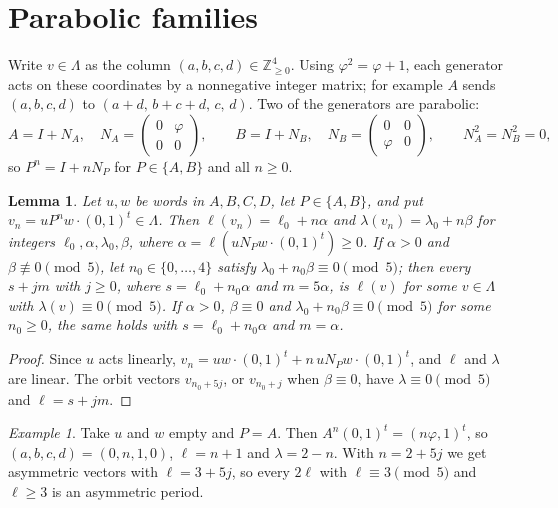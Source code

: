 \documentclass[11pt]{article}
\newtheorem{lemma}[theorem]{Lemma}
\theoremstyle{definition}
\theoremstyle{remark}
\newtheorem{example}[theorem]{Example}
\begin{document}
\section{Parabolic families}\label{sec:families}

Write $v\in\Lambda$ as the column $(a,b,c,d)\in\mathbb{Z}_{\ge0}^4$. Using
$\varphi^2=\varphi+1$, each generator acts on these coordinates by a
nonnegative integer matrix; for example $A$ sends $(a,b,c,d)$ to
$(a+d,\,b+c+d,\,c,\,d)$. Two of the generators are parabolic:
\[
A=I+N_A,\quad N_A=\begin{pmatrix}0&\varphi\\0&0\end{pmatrix},\qquad
B=I+N_B,\quad N_B=\begin{pmatrix}0&0\\\varphi&0\end{pmatrix},
\qquad N_A^2=N_B^2=0,
\]
so $P^n=I+nN_P$ for $P\in\{A,B\}$ and all $n\ge0$.

\begin{lemma}\label{lem:family}
Let $u,w$ be words in $A,B,C,D$, let $P\in\{A,B\}$, and put
$v_n=uP^nw\cdot(0,1)^t\in\Lambda$. Then $\ell(v_n)=\ell_0+n\alpha$ and
$\lambda(v_n)=\lambda_0+n\beta$ for integers $\ell_0,\alpha,\lambda_0,\beta$,
where $\alpha=\ell(uN_Pw\cdot(0,1)^t)\ge0$. If $\alpha>0$ and
$\beta\not\equiv0\pmod5$, let $n_0\in\{0,\dots,4\}$ satisfy
$\lambda_0+n_0\beta\equiv0\pmod5$; then every $s+jm$ with $j\ge0$, where
$s=\ell_0+n_0\alpha$ and $m=5\alpha$, is $\ell(v)$ for some $v\in\Lambda$
with $\lambda(v)\equiv0\pmod5$. If $\alpha>0$, $\beta\equiv0$ and
$\lambda_0+n_0\beta\equiv0\pmod5$ for some $n_0\ge0$, the same holds with
$s=\ell_0+n_0\alpha$ and $m=\alpha$.
\end{lemma}

\begin{proof}
Since $u$ acts linearly, $v_n=uw\cdot(0,1)^t+n\,uN_Pw\cdot(0,1)^t$, and
$\ell$ and $\lambda$ are linear. The orbit vectors $v_{n_0+5j}$, or
$v_{n_0+j}$ when $\beta\equiv0$, have $\lambda\equiv0\pmod5$ and
$\ell=s+jm$.
\end{proof}

\begin{example}
Take $u$ and $w$ empty and $P=A$. Then $A^n(0,1)^t=(n\varphi,1)^t$, so
$(a,b,c,d)=(0,n,1,0)$, $\ell=n+1$ and $\lambda=2-n$. With $n=2+5j$ we get
asymmetric vectors with $\ell=3+5j$, so every $2\ell$ with
$\ell\equiv3\pmod5$ and $\ell\ge3$ is an asymmetric period.
\end{example}
\end{document}
